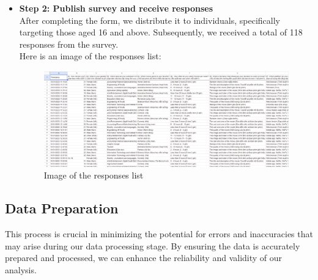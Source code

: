 \begin{itemize}
            \item \textbf{Step 2: Publish survey and receive responses}\\
            After completing the form, we distribute it to individuals, specifically targeting those aged 16 and above. Subsequently, we received a total of 118 responses from the survey. \\
            Here is an image of the responses list:
                \begin{figure}[H]
                    \centering
                    \includegraphics[scale=0.4]{graphics/data/dataResponses1.png}
                    \caption{Image of the responses list}
                \end{figure}
        \end{itemize}
        
    \subsection{Data Preparation}
   This process is crucial in minimizing the potential for errors and inaccuracies that may arise during our data processing stage. By ensuring the data is accurately prepared and processed, we can enhance the reliability and validity of our analysis.
    
